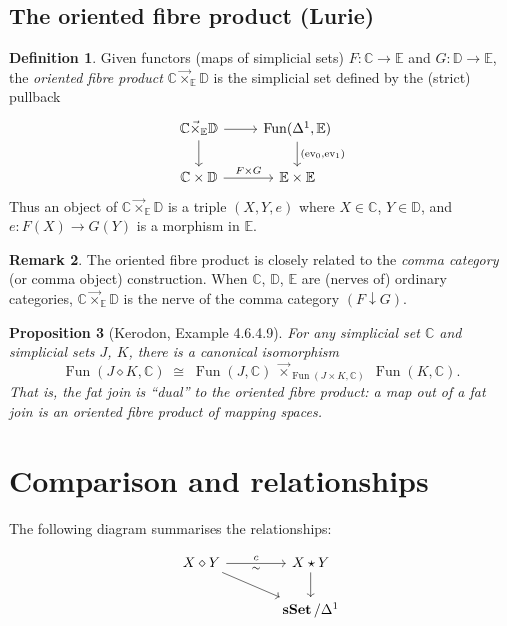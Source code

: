 \documentclass{article}
\newtheorem{proposition}{Proposition}
\theoremstyle{definition}
\newtheorem{definition}[proposition]{Definition}
\newtheorem{remark}[proposition]{Remark}
\newcommand{\C}{\mathbb{C}}
\newcommand{\D}{\mathbb{D}}
\newcommand{\E}{\mathbb{E}}
\DeclareMathOperator{\sSet}{\mathbf{sSet}}
\DeclareMathOperator{\Fun}{Fun}
\begin{document}
\subsection{The oriented fibre product (Lurie)}

\begin{definition}\label{oriented-fibre}
	Given functors (maps of simplicial sets) $F : \C \to \E$ and $G : \D \to \E$, the \emph{oriented fibre product} $\C \vec{\times}_\E \D$ is the simplicial set defined by the (strict) pullback
	\[\begin{tikzcd}[ampersand replacement=\&]
		{\C \vec{\times}_\E \D} \& {\Fun(\Delta^1, \E)} \\
		{\C \times \D} \& {\E \times \E}
		\arrow[from=1-1, to=1-2]
		\arrow[from=1-1, to=2-1]
		\arrow["{(\mathrm{ev}_0, \mathrm{ev}_1)}", from=1-2, to=2-2]
		\arrow["{F \times G}", from=2-1, to=2-2]
	\end{tikzcd}\]
	Thus an object of $\C \vec{\times}_\E \D$ is a triple $(X, Y, e)$ where $X \in \C$, $Y \in \D$, and $e : F(X) \to G(Y)$ is a morphism in $\E$.
\end{definition}

\begin{remark}
	The oriented fibre product is closely related to the \emph{comma category} (or comma object) construction. When $\C$, $\D$, $\E$ are (nerves of) ordinary categories, $\C \vec{\times}_\E \D$ is the nerve of the comma category $(F \downarrow G)$.
\end{remark}

\begin{proposition}[{Kerodon, Example 4.6.4.9}]\label{fat-join-oriented}
	For any simplicial set $\C$ and simplicial sets $J$, $K$, there is a canonical isomorphism
	\[\Fun(J \diamond K, \C) \;\cong\; \Fun(J, \C) \;\vec{\times}_{\Fun(J \times K, \C)}\; \Fun(K, \C).\]
	That is, the fat join is ``dual'' to the oriented fibre product: a map out of a fat join is an oriented fibre product of mapping spaces.
\end{proposition}

\section{Comparison and relationships}

The following diagram summarises the relationships:

\[\begin{tikzcd}[ampersand replacement=\&, column sep=large]
	{X \diamond Y} \& {X \star Y} \\
	\& {\sSet / \Delta^1}
	\arrow["{c}", "\sim"', from=1-1, to=1-2]
	\arrow[from=1-1, to=2-2]
	\arrow[from=1-2, to=2-2]
\end{tikzcd}\]
\end{document}
